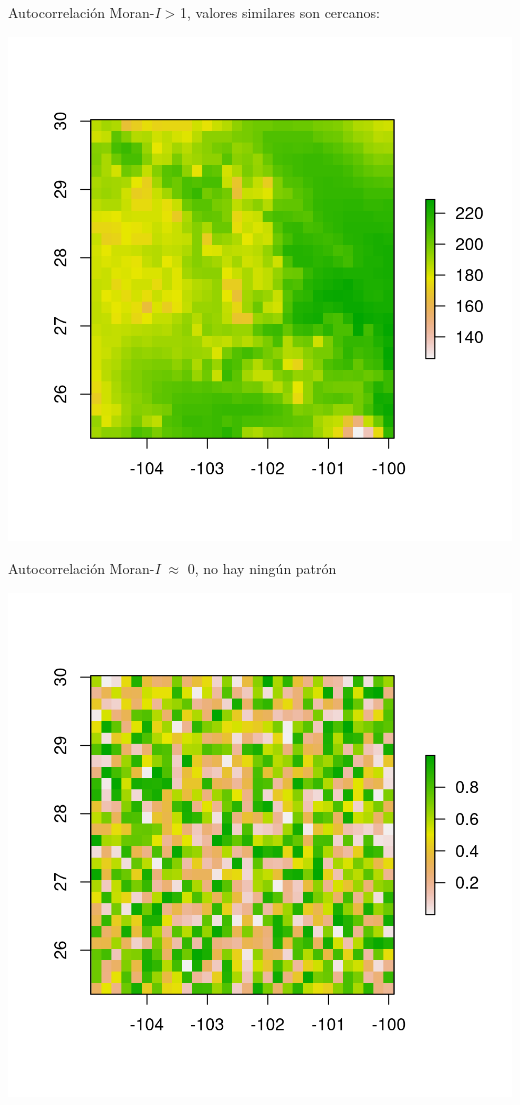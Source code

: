\documentclass[
  11pt,
  ignorenonframetext,
]{beamer}
\begin{document}
\begin{frame}{Autocorrelación}
\protect\hypertarget{autocorrelaciuxf3n-1}{}
Moran-\emph{I} \textgreater{} 1, valores similares son cercanos:

\begin{center}\includegraphics{Figuras/Moran-1-1} \end{center}
\end{frame}

\begin{frame}{Autocorrelación}
\protect\hypertarget{autocorrelaciuxf3n-2}{}
Moran-\emph{I} \(\approx\) 0, no hay ningún patrón

\begin{center}\includegraphics{Figuras/Moran-2-1} \end{center}
\end{frame}
\end{document}
